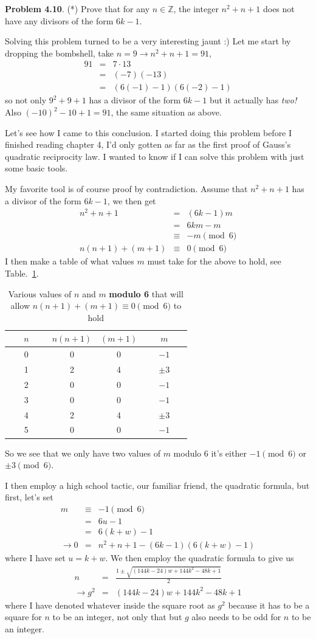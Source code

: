 \documentclass[aps,preprint,preprintnumbers,nofootinbib,showpacs,prd]{revtex4-1}
\newcommand{\nbea}{\begin{eqnarray*}}
\newcommand{\neea}{\end{eqnarray*}}
\begin{document}
{\bf Problem 4.10}. (*) Prove that for any $n \in \mathbb{Z}$, the integer $n^2 + n + 1$ does not have any divisors of the form $6k - 1$.

Solving this problem turned to be a very interesting jaunt :) Let me start by dropping the bombshell, take $n = 9 \to n^2 + n + 1 = 91$,
%
\nbea
91 & = & 7 \cdot 13 \\
& = & (-7) (-13) \\
& = & (6(-1) - 1)(6(-2) - 1)
\neea
%
so not only $9^2 + 9 + 1$ has a divisor of the form $6k - 1$ but it actually has {\it two!} Also $(-10)^2 - 10 + 1 = 91$, the same situation as above.

Let's see how I came to this conclusion. I started doing this problem before I finished reading chapter 4, I'd only gotten as far as the first proof of Gauss's quadratic reciprocity law. I wanted to know if I can solve this problem with just some basic tools.

My favorite tool is of course proof by contradiction. Assume that $n^2 + n + 1$ has a divisor of the form $6k - 1$, we then get
%
\nbea
n^2 + n + 1 & = & (6k - 1)m \\
& = & 6km - m \\
& \equiv & -m \pmod{6} \\
n(n + 1) + (m + 1) & \equiv & 0 \pmod{6}
\neea
%
I then make a table of what values $m$ must take for the above to hold, see Table.~\ref{Tab:6}.
%
\begin{table}[]
\centering
\caption{Various values of $n$ and $m$ {\bf modulo 6} that will allow $n(n + 1) + (m + 1) \equiv 0 \pmod{6}$ to hold}
\label{Tab:6}
\begin{tabular}{|c|c|c|c|}
\hline
~~~$n$~~~ & $n(n+1)$ & $(m + 1)$ & ~~~$m$~~~ \\ \hline
0 & 0 & 0 & $-1$ \\ \hline
1 & 2 & 4 & $\pm3$ \\ \hline
2 & 0 & 0 & $-1$ \\ \hline
3 & 0 & 0 & $-1$ \\ \hline
4 & 2 & 4 & $\pm3$ \\ \hline
5 & 0 & 0 & $-1$ \\ \hline
\end{tabular}
\end{table}
%
So we see that we only have two values of $m$ modulo 6 it's either $-1 \pmod{6}$ or $\pm3 \pmod{6}$.

I then employ a high school tactic, our familiar friend, the quadratic formula, but first, let's set
%
\nbea
m & \equiv & -1 \pmod{6} \\
& = & 6u - 1 \\
& = & 6(k + w) - 1 \\
\to 0 & = & n^2 + n + 1 - (6k - 1)(6(k + w) - 1)
\neea
%
where I have set $u = k + w$. We then employ the quadratic formula to give us
%
\nbea
n & = & \frac{1 \pm \sqrt{(144k-24)w+144k^2-48k+1}}{2} \\
\to g^2 & = & (144k-24)w+144k^2-48k+1
\neea
%
where I have denoted whatever inside the square root as $g^2$ because it has to be a square for $n$ to be an integer, not only that but $g$ also needs to be odd for $n$ to be an integer.
\end{document}
